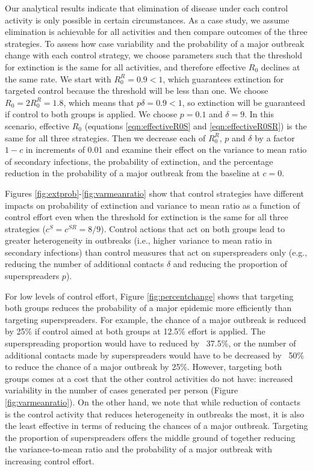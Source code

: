 \documentclass{imammb}
\numberwithin{equation}{section}
\begin{document}
Our analytical results indicate that elimination of disease under each control activity is only possible in certain circumstances. As a case study, we assume elimination is achievable for all activities and then compare outcomes of the three strategies.  To assess how case variability and the probability of a major outbreak change with each control strategy, we choose parameters such that the threshold for extinction is the same for all activities, and therefore effective $R_0$ declines at the same rate. We start with $R_0^R = 0.9 <1$, which guarantees extinction for targeted control because the threshold will be less than one. We choose $R_0 = 2 R_0^R = 1.8$, which means that $p \delta = 0.9 <1$, so extinction will be guaranteed if control to both groups is applied. We choose $p = 0.1$ and $\delta = 9$. In this scenario, effective $R_0$ (equations \eqref{eqn:effectiveR0S} and \eqref{eqn:effectiveR0SR}) is the same for all three strategies. Then we decrease each of $R_0^R$, $p$ and $\delta$ by a factor $1-c$ in increments of 0.01 and examine their effect on the variance to mean ratio of secondary infections, the probability of extinction, and the percentage reduction in the probability of a major outbreak from the baseline at $c=0$.


Figures \ref{fig:extprob}-\ref{fig:varmeanratio} show that control strategies have different impacts on probability of extinction and variance to mean ratio as a function of control effort even when the threshold for extinction is the same for all three strategies ($c^S = c^{SR} = 8/9$). Control actions that act on both groups lead to greater heterogeneity in outbreaks (i.e., higher variance to mean ratio in secondary infections) than control measures that act on superspreaders only (e.g., reducing the number of additional contacts $\delta$ and reducing the proportion of superspreaders $p$). 

For low levels of control effort, Figure \ref{fig:percentchange} shows that targeting both groups reduces the probability of a major epidemic more efficiently than targeting superspreaders. For example, the chance of a major outbreak is reduced by 25\% if control aimed at both groups at 12.5\% effort is applied. The superspreading proportion would have to reduced by ~37.5\%, or the number of additional contacts made by superspreaders would have to be decreased by ~50\% to reduce the chance of a major outbreak by 25\%.  However, targeting both groups comes at a cost that the other control activities do not have: increased variability in the number of cases generated per person (Figure \ref{fig:varmeanratio}). On the other hand, we note that while reduction of contacts is the control activity that reduces heterogeneity in outbreaks the most, it is also the least effective in terms of reducing the chances of a major outbreak. Targeting the proportion of superspreaders offers the middle ground of together reducing the variance-to-mean ratio and the probability of a major outbreak with increasing control effort. %
\end{document}
